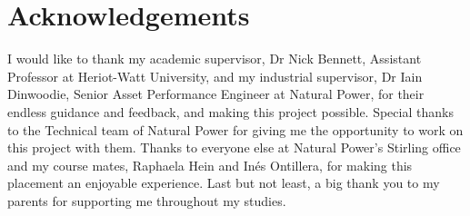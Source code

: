 \chapter{Acknowledgements}

I would like to thank my academic supervisor, Dr Nick Bennett, Assistant
Professor at Heriot-Watt University, and my industrial supervisor, Dr Iain
Dinwoodie, Senior Asset Performance Engineer at Natural Power, for their
endless guidance and feedback, and making this project possible. Special
thanks to the Technical team of Natural Power for giving me the opportunity to
work on this project with them. Thanks to everyone else at Natural Power's
Stirling office and my course mates, Raphaela Hein and Inés Ontillera, for
making this placement an enjoyable experience. Last but not least, a big
thank you to my parents for supporting me throughout my studies.
